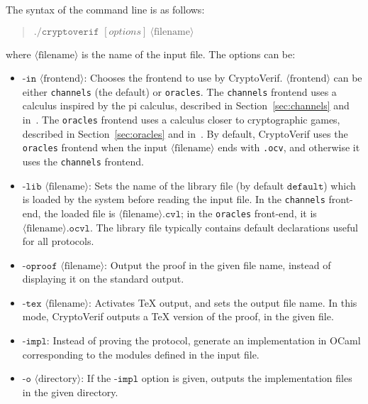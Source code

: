 \documentclass{article}
\newcommand{\nonterm}[1]{\langle\textrm{#1}\rangle}
\begin{document}
The syntax of the command line is as follows:
\begin{quote}
$\texttt{./cryptoverif }[options]\ \nonterm{filename}$
\end{quote}
where $\nonterm{filename}$ is the name of the input file.
The options can be:
\begin{itemize}

\item $\texttt{-in }\nonterm{frontend}$: Chooses the frontend to use
by CryptoVerif. $\nonterm{frontend}$ can be either \texttt{channels}
(the default) or \texttt{oracles}. The \texttt{channels} frontend
uses a calculus inspired by the pi calculus, described 
in Section~\ref{sec:channels} and in~\cite{Blanchet06,BlanchetEPrint05}.
The \texttt{oracles} frontend uses a calculus closer to cryptographic
games, described in Section~\ref{sec:oracles} and 
in~\cite{Blanchet06b,BlanchetPointchevalEPrint06}.
By default, CryptoVerif uses the \texttt{oracles} frontend when the input
$\nonterm{filename}$ ends with \texttt{.ocv}, and otherwise it uses the
\texttt{channels} frontend.

\item $\texttt{-lib }\nonterm{filename}$: Sets the name of the library
  file (by default $\texttt{default}$) which is loaded by the system
  before reading the input file. In the \texttt{channels} front-end,
  the loaded file is $\nonterm{filename}\texttt{.cvl}$; in the
  \texttt{oracles} front-end, it is
  $\nonterm{filename}\texttt{.ocvl}$. The library file typically
  contains default declarations useful for all protocols.

\item $\texttt{-oproof }\nonterm{filename}$: Output the proof
in the given file name, instead of displaying it on the standard output.

\item $\texttt{-tex }\nonterm{filename}$: Activates TeX output, and sets
the output file name. In this mode, CryptoVerif outputs a TeX version
of the proof, in the given file.

\item $\texttt{-impl}$: Instead of proving the protocol, generate an
  implementation in OCaml corresponding to the modules defined in the input
  file.

\item $\texttt{-o }\nonterm{directory}$: If the $\texttt{-impl}$ option
  is given, outputs the implementation files in the given directory.

\end{itemize}
\end{document}
